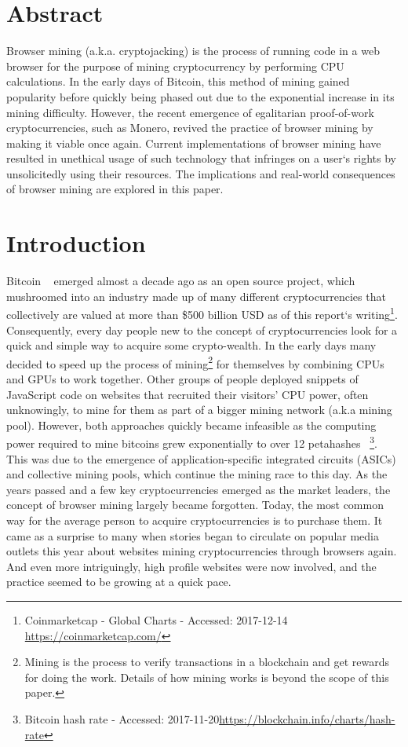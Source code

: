 \section{Abstract}

Browser mining (a.k.a. cryptojacking) is the process of running code in a web browser for the purpose of mining  cryptocurrency by performing CPU calculations. In the early days of Bitcoin, this method of mining gained popularity before quickly being phased out due to the exponential increase in its mining difficulty. However, the recent emergence of egalitarian proof-of-work cryptocurrencies, such as Monero, revived the practice of browser mining by making it viable once again. Current implementations of browser mining have resulted in unethical usage of such technology that infringes on a user`s rights by unsolicitedly using their resources. The implications and real-world consequences of browser mining are explored in this paper.

\section{Introduction}
Bitcoin ~\cite{nakamoto2008bitcoin} emerged almost a decade ago as an open source project, which mushroomed into an industry made up of many different cryptocurrencies that collectively are valued at more than \$500 billion USD as of this report`s writing\footnote{Coinmarketcap - Global Charts - Accessed: 2017-12-14 \url{https://coinmarketcap.com/}}. Consequently, every day people new to the concept of cryptocurrencies look for a quick and simple way to acquire some crypto-wealth. In the early days many decided to speed up the process of mining\footnote{Mining is the process to verify transactions in a blockchain and get rewards for doing the work. Details of how mining works is beyond the scope of this paper.} for themselves by combining CPUs and GPUs to work together. Other groups of people deployed snippets of JavaScript code on websites that recruited their visitors’ CPU power, often unknowingly, to mine for them as part of a bigger mining network (a.k.a mining pool). However, both approaches quickly became infeasible as the computing power required to mine bitcoins grew exponentially to over 12 petahashes ~\footnote{Bitcoin hash rate - Accessed: 2017-11-20\url{https://blockchain.info/charts/hash-rate}}. This was due to the emergence of application-specific integrated circuits (ASICs) and collective mining pools, which continue the mining race to this day. As the years passed and a few key cryptocurrencies emerged as the market leaders, the concept of browser mining largely became forgotten. Today, the most common way for the average person to acquire cryptocurrencies is to purchase them. It came as a surprise to many when stories began to circulate on popular media outlets this year about websites mining cryptocurrencies through browsers again. And even more intriguingly, high profile websites were now involved, and the practice seemed to be growing at a quick pace.

